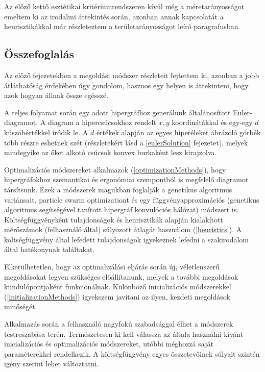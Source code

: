 Az előző kettő esztétikai kritériumrendszeren kívül még a méretarányosságot emeltem ki az irodalmi áttekintés során, azonban annak kapcsolatát a heurisztikákkal már részleteztem a területarányosságot leíró paragrafusban.


\subsection{Összefoglalás}

Az előző fejezetekben a megoldási módszer részleteit fejtettem ki, azonban a jobb átláthatóság érdekében úgy gondolom, hasznos egy helyen is áttekinteni, hogy azok hogyan állnak össze egésszé.


A teljes folyamat során egy adott hipergráfhoz generálunk általánosított Euler-diagramot. A diagram a hipercsúcsokhoz rendelt $x,y$ koordinátákkal és egy-egy $d$ küszöbértékkel íródik le. A $d$ értékek alapján az egyes hiperéleket ábrázoló görbék több részre eshetnek szét (részletekért lásd a \ref{eulerSolution} fejezetet), melyek mindegyike az őket alkotó csúcsok konvex burkaként lesz kirajzolva.


Optimalizációs módszereket alkalmazok (\ref{optimizationMethods}), hogy hipergráfokhoz szemantikai és ergonómiai szempontból is megfelelő diagramot társítsunk. Ezek a módszerek magukban foglalják a genetikus algoritmus variánsait, particle swarm optimizationt és egy függvényapproximációs (genetikus algoritmus segítségével tanított hipergráf konvulóciós hálózat) módszert is. Költségfüggvényként tulajdonságok és heurisztikák alapján kialakított mérőszámok (felhasználó által) súlyozott átlagát használom (\ref{heuristics}). A költségfüggvény által lefedett tulajdonságok igyekeznek lefedni a szakirodalom által hatékonynak találtakat.


Elkerülhetetlen, hogy az optimalizálási eljárás során új, véletlenszerű megoldásokat legyen szükséges előállítanunk, melyek a további megoldások kiindulópontjaként funkcionálnak. Különböző inicializációs módszerekkel (\ref{initializationMethods}) igyekszem javítani az ilyen, kezdeti megoldások minőségét.

Alkalmazás során a felhasználó nagyfokú szabadsággal élhet a módszerek testreszabása terén. Természetesen ki kell válassza az általa használni kívánt inicializációs és optimalizációs módszereket, utóbbi méghozzá saját paraméterekkel rendelkezik. A költségfüggvény egyes összetevőinek súlyait szintén igény szerint lehet változtatni.


